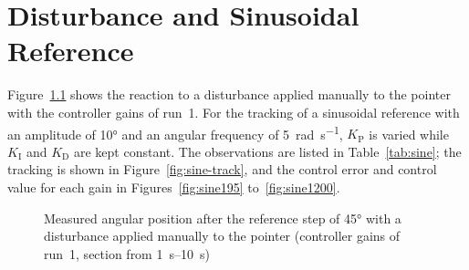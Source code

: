 \chapter{Disturbance and Sinusoidal Reference}\label{app:data}
Figure~\ref{fig:disturbance} shows the reaction to a disturbance applied manually to the
pointer with the controller gains of run~1. For the tracking of a sinusoidal
reference with an amplitude of \ang{10} and an angular frequency of
\qty{5}{\radian\per\second}, $K_\mathrm{P}$ is varied while $K_\mathrm{I}$ and
$K_\mathrm{D}$ are kept constant. The observations are listed in
Table~\ref{tab:sine}; the tracking is shown
in Figure~\ref{fig:sine-track}, and the control error and control value for each
gain in Figures~\ref{fig:sine195} to~\ref{fig:sine1200}.

\begin{figure}[H]
  \centering
  \caption[Reaction to a disturbance]{Measured angular position after the
    reference step of \ang{45} with a disturbance applied manually to the pointer
    (controller gains of run~1, section from \qtyrange{1}{10}{\second})}
  \label{fig:disturbance}
\end{figure}

